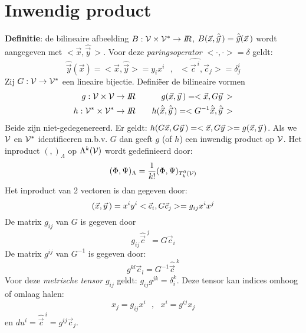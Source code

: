 \section{Inwendig product}
{\bf Definitie}: de bilineaire afbeelding $B:{\cal V}\times{\cal V}^*\rightarrow I\hspace{-1mm}R$,
$B(\vec{x},\hat{\vec{y}}\,)=\hat{\vec{y}}(\vec{x}\,)$ wordt aangegeven met
$<\vec{x},\hat{\vec{y}}\,>$.
Voor deze {\it paringsoperator} $<\cdot,\cdot>=\delta$ geldt:
\[
\hat{\vec{y}}(\vec{x})=<\vec{x},\hat{\vec{y}}>=y_ix^i~~~,~~~<\hat{\vec{c}^{~i}},\vec{c}_j>=\delta_j^i
\]
Zij $G:{\cal V}\rightarrow{\cal V}^*$ een lineaire bijectie. Defini\"eer de
bilineaire vormen
\begin{eqnarray*}
g:{\cal V\times V}\rightarrow I\hspace{-1mm}R&~~~&g(\vec{x},\vec{y}\,)=<\vec{x},G\vec{y}\,>\\
h:{\cal V^*\times V^*}\rightarrow I\hspace{-1mm}R&~~~&h(\hat{\vec{x}},\hat{\vec{y}}\,)=<G^{-1}\hat{\vec{x}},\hat{\vec{y}}\,>
\end{eqnarray*}
Beide zijn niet-gedegenereerd. Er geldt: $h(G\vec{x},G\vec{y}\,)=<\vec{x},G\vec{y}>=g(\vec{x},\vec{y}\,)$.
Als we $\cal V$ en $\cal V^*$ identificeren m.b.v. $G$ dan geeft $g$ (of $h$)
een inwendig product op $\cal V$.
\npar
Het inproduct $(,)_\Lambda$ op $\Lambda^k(\cal V)$ wordt gedefinieerd door:
\[
(\Phi,\Psi)_\Lambda=\frac{1}{k!}(\Phi,\Psi)_{T^0_k(\cal V)}
\]
Het inproduct van 2 vectoren is dan gegeven door:
\[
(\vec{x},\vec{y}\,)=x^iy^i<\vec{c}_i,G\vec{c}_j>=g_{ij}x^ix^j
\]
De matrix $g_{ij}$ van $G$ is gegeven door
\[
g_{ij}\hat{\vec{c}}^{~j}=G\vec{c}_i
\]
De matrix $g^{ij}$ van $G^{-1}$ is gegeven door:
\[
g^{kl}\vec{c}_l=G^{-1}\hat{\vec{c}}^{~k}
\]
Voor deze {\it metrische tensor} $g_{ij}$ geldt: $g_{ij}g^{jk}=\delta_i^k$.
Deze tensor kan indices omhoog of omlaag halen:
\[
x_j=g_{ij}x^i~~~,~~~x^i=g^{ij}x_j
\]
en $du^i=\hat{\vec{c}}^{~i}=g^{ij}\vec{c}_j$.
\npar


